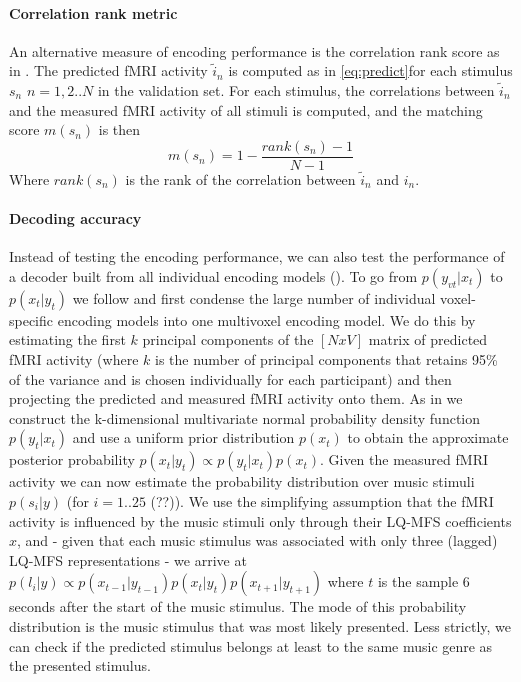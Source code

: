 \paragraph{Correlation rank metric}
An alternative measure of encoding performance is the correlation rank score as in \cite{SF14}. The predicted f{MRI} activity $\widetilde{i}_{n}$ is computed as in \ref{eq:predict}for each stimulus $s_{n}$ $n=1,2..N$  in the validation set.
For each stimulus, the correlations between $\widetilde{i}_{n}$ and the measured f{MRI} activity of all stimuli is computed, and the matching score $m(s_{n})$ is then
\[ m(s_{n}) = 1-\frac{rank(s_{n})-1}{N-1} \]
Where $rank(s_{n})$ is the rank of the correlation between $\widetilde{i}_{n}$ and $i_{n}$.

\paragraph{Decoding accuracy}

Instead of testing the encoding performance, we can also test the performance of a decoder built from all individual encoding models (\cite{NG11}). To go from $p(y_{vt}|x_{t})$ to $p(x_{t}|y_{t})$ we follow \cite{NG09} and first condense the large number of individual voxel-specific encoding models into one multivoxel encoding model. We do this by estimating the first $k$ principal components of the $[N x V]$ matrix of predicted f{MRI} activity (where $k$ is the number of principal components that retains 95\% of the variance and is chosen individually for each participant) and then projecting the predicted and measured f{MRI} activity onto them. As in \cite{NG09} we construct the k-dimensional multivariate normal probability density function $p(y_{t}|x_{t})$ and use a uniform prior distribution $p(x_{t})$ to obtain the approximate posterior probability $p(x_{t}|y_{t}) \propto p(y_{t}|x_{t})p(x_{t})$. Given the measured f{MRI} activity we can now estimate the probability distribution over music stimuli $p(s_{i}|y)$ (for $i=1..25$ (??)). We use the simplifying assumption that the f{MRI} activity is influenced by the music stimuli only through their LQ-MFS coefficients $x$, and - given that each music stimulus was associated with only three (lagged) LQ-MFS representations - we arrive at $p(l_{i}|y) \propto p(x_{t-1}|y_{t-1})p(x_{t}|y_{t})p(x_{t+1}|y_{t+1})$ where $t$ is the sample 6 seconds after the start of the music stimulus. The mode of this probability distribution is the music stimulus that was most likely presented. Less strictly, we can check if the predicted stimulus belongs at least to the same music genre as the presented stimulus. 

